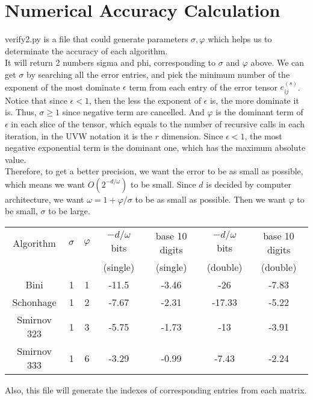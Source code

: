 \documentclass{article}
\begin{document}
\section{Numerical Accuracy Calculation}
verify2.py is a file that could generate parameters $\sigma, \varphi$ which helps us to determinate the accuracy of each algorithm. \\
It will return 2 numbers sigma and phi, corresponding to $\sigma$ and $\varphi$ above. We can get $\sigma$ by searching all the error entries, and pick the minimum number of the exponent of the most dominate $\epsilon$ term from each entry of the error tensor $e_{ij}^{(s)}$. Notice that since $\epsilon < 1$, then the less the exponent of $\epsilon$ is, the more dominate it is. Thus, $\sigma \geq 1$ since negative term are cancelled. And $\varphi$ is the dominant term of $\epsilon$ in each slice of the tensor, which equals to the number of recursive calls in each iteration, in the UVW notation it is the $r$ dimension. Since $\epsilon < 1$, the most negative exponential term is the dominant one, which has the maximum absolute value.\\
Therefore, to get a better precision, we want the error to be as small as possible, which means we want $O(2^{-d/\omega})$ to be small. Since $d$ is decided by computer architecture, we want $\omega = 1+\varphi / \sigma$ to be as small as possible. Then we want $\varphi$ to be small, $\sigma$ to be large.
\begin{center}
 \begin{tabular}{||c c c c c c c||} 
 \hline
 Algorithm & $\sigma$ & $\varphi$ & $-d/\omega$ bits & base 10 digits & $-d/\omega$ bits & base 10 digits \\
  & & & (single) & (single) & (double) & (double)\\ [0.5ex] 
 \hline\hline
 Bini & 1 & 1 & -11.5 & -3.46 & -26 & -7.83\\
 \hline
 Schonhage & 1 & 2 & -7.67 & -2.31 & -17.33 & -5.22\\
 \hline
 Smirnov 323 & 1 & 3 & -5.75 & -1.73 & -13 & -3.91\\
 \hline
 Smirnov 333 & 1 & 6 & -3.29 & -0.99 & -7.43 & -2.24\\ [1ex] 
 \hline
\end{tabular}
\end{center}
Also, this file will generate the indexes of corresponding entries from each matrix.




\end{document}
